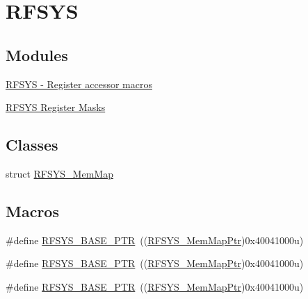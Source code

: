 \hypertarget{group___r_f_s_y_s___peripheral}{}\section{R\+F\+S\+YS}
\label{group___r_f_s_y_s___peripheral}
\subsection*{Modules}
\begin{DoxyCompactItemize}
\item 
\hyperlink{group___r_f_s_y_s___register___accessor___macros}{R\+F\+S\+Y\+S -\/ Register accessor macros}
\item 
\hyperlink{group___r_f_s_y_s___register___masks}{R\+F\+S\+Y\+S Register Masks}
\end{DoxyCompactItemize}
\subsection*{Classes}
\begin{DoxyCompactItemize}
\item 
struct \hyperlink{struct_r_f_s_y_s___mem_map}{R\+F\+S\+Y\+S\+\_\+\+Mem\+Map}
\end{DoxyCompactItemize}
\subsection*{Macros}
\begin{DoxyCompactItemize}
\item 
\#define \hyperlink{group___r_f_s_y_s___peripheral_ga2dab66eae1abcaf22879dbce661ea2fa}{R\+F\+S\+Y\+S\+\_\+\+B\+A\+S\+E\+\_\+\+P\+TR}~((\hyperlink{group___r_f_s_y_s___peripheral_gaea9e2f6aeeb4976615e3c3dd87acff9e}{R\+F\+S\+Y\+S\+\_\+\+Mem\+Map\+Ptr})0x40041000u)
\item 
\#define \hyperlink{group___r_f_s_y_s___peripheral_ga2dab66eae1abcaf22879dbce661ea2fa}{R\+F\+S\+Y\+S\+\_\+\+B\+A\+S\+E\+\_\+\+P\+TR}~((\hyperlink{group___r_f_s_y_s___peripheral_gaea9e2f6aeeb4976615e3c3dd87acff9e}{R\+F\+S\+Y\+S\+\_\+\+Mem\+Map\+Ptr})0x40041000u)
\item 
\#define \hyperlink{group___r_f_s_y_s___peripheral_ga2dab66eae1abcaf22879dbce661ea2fa}{R\+F\+S\+Y\+S\+\_\+\+B\+A\+S\+E\+\_\+\+P\+TR}~((\hyperlink{group___r_f_s_y_s___peripheral_gaea9e2f6aeeb4976615e3c3dd87acff9e}{R\+F\+S\+Y\+S\+\_\+\+Mem\+Map\+Ptr})0x40041000u)
\end{DoxyCompactItemize}
